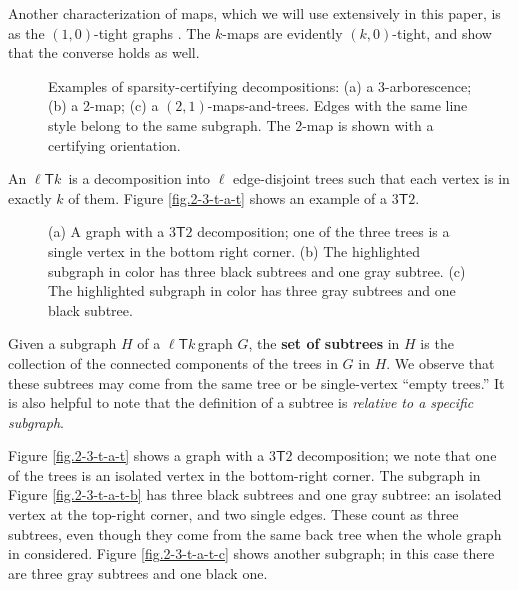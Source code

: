\documentclass[11pt]{article}
\newcommand{\ellteekay}{\ensuremath{\ell{\mathsf T}k}\,}
\newcommand{\reffig}[1]{Figure \ref{fig.#1}}
\begin{document}
Another characterization of maps, which we will use extensively in this paper, is as the $(1,0)$-tight graphs \cite{whiteley:union-matroids,maps}. The $k$-maps are evidently $(k,0)$-tight, and \cite{whiteley:union-matroids,maps} show that the converse holds as well. 

\begin{figure}[htbp]
	\centering
	\hspace{.3in}
	\hspace{.3 in}
	\caption{Examples of sparsity-certifying decompositions: (a) a $3$-arborescence; (b) a 2-map;  (c)  a $(2,1)$-maps-and-trees.  Edges with the same line style belong to the 
	same subgraph.  The 2-map is shown with a certifying orientation.}
	\end{figure}

An \ellteekay 
is a decomposition into $\ell$ edge-disjoint trees such that each vertex is in 
exactly $k$ of them.  \reffig{2-3-t-a-t} shows an example of a $3{\mathsf T}2$.

\begin{figure}[htbp]
	\centering
	\subfigure[]{\texttt{[image: 2-3-t-a-t]}\label{fig.2-3-t-a-t}}
	\hspace{.3in}
	\subfigure[]{\texttt{[image: 2-3-t-a-t-b]}\label{fig.2-3-t-a-t-b}}
	\hspace{.3in}
	\subfigure[]{\texttt{[image: 2-3-t-a-t-c]}\label{fig.2-3-t-a-t-c}}
	\caption{(a) A graph with a $3\mathsf{T}2$ decomposition; one of the three trees is 
	a single vertex in the bottom right corner.  (b) The highlighted subgraph in color has three black
	subtrees and one gray subtree.  (c) The highlighted subgraph in color has three gray subtrees and one
	black subtree.}
	\end{figure}

	Given a subgraph $H$ of a \ellteekay graph $G$, the {\bf set of subtrees} in $H$ is 
	the collection of the connected components of the trees in $G$ in $H$. 
	We observe that these subtrees may come from the same tree or be single-vertex ``empty trees.'' 
	It is also helpful to note that the definition of a subtree is {\it relative to a specific 
	subgraph}.
	
	\reffig{2-3-t-a-t} shows a graph with a $3\mathsf{T}2$ decomposition; we note that one
	of the trees is an isolated vertex in the bottom-right corner.  The subgraph in 
	\reffig{2-3-t-a-t-b} has three black subtrees and one gray subtree: an isolated vertex at
	the top-right corner, and two single edges.  These count as three subtrees, even though 
	they come from the same back tree when the whole graph in considered.  \reffig{2-3-t-a-t-c}
	shows another subgraph; in this case there are three gray subtrees and one black one.
	
\end{document}

